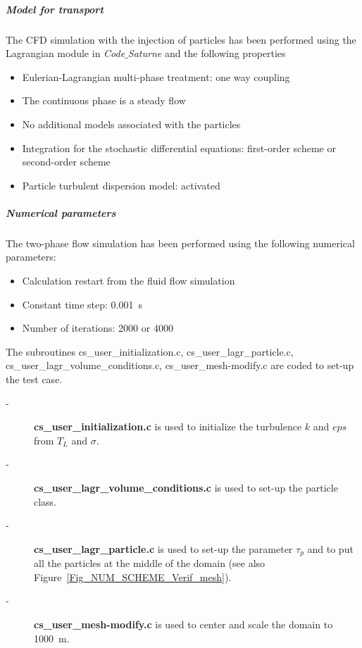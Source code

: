 \subparagraph{Model for transport} The CFD simulation with the injection of particles has been performed using the Lagrangian module in \textit{Code$\_$Saturne} and the following properties
\begin{itemize}
 \item Eulerian-Lagrangian multi-phase treatment: one way coupling
 \item The continuous phase is a steady flow
 \item No additional models associated with the particles
 \item Integration for the stochastic differential equations: first-order scheme or second-order scheme
 \item Particle turbulent dispersion model: activated
\end{itemize}
\subparagraph{Numerical parameters} The two-phase flow simulation has been performed using the following numerical parameters:
\begin{itemize}
 \item Calculation restart from the fluid flow simulation
 \item Constant time step: \SI{0.001}{s}
 \item Number of iterations: \SI{2000}{} or \SI{4000}{}
\end{itemize}



The subroutines cs\_user\_initialization.c, cs\_user\_lagr\_particle.c, cs\_user\_lagr\_volume\_conditions.c, cs\_user\_mesh-modify.c are coded to set-up the test case.

\begin{description}

   \item[-] \textbf{cs\_user\_initialization.c} is used to initialize the turbulence $k$ and $eps$ from $T_L$ and $\sigma$. 
   \item[-] \textbf{cs\_user\_lagr\_volume\_conditions.c} is used to set-up the particle class. 
   \item[-] \textbf{cs\_user\_lagr\_particle.c} is used to set-up the parameter $\tau_p$ and to put all the particles at the middle of the domain (see also Figure~\ref{Fig_NUM_SCHEME_Verif_mesh}). 
   \item[-] \textbf{cs\_user\_mesh-modify.c} is used to center and scale the domain to \SI{1000}{m}.

\end{description}

